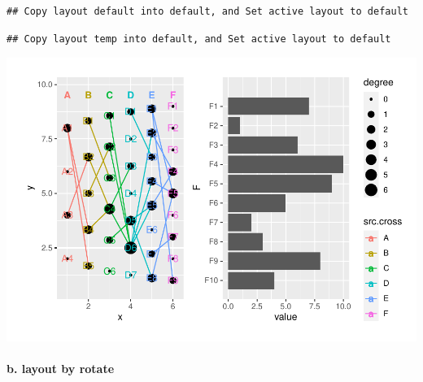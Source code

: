 \documentclass[
]{article}
\let\oldparagraph\paragraph
\renewcommand{\paragraph}[1]{\oldparagraph{#1}\mbox{}}
\begin{document}
\begin{verbatim}
## Copy layout default into default, and Set active layout to default
\end{verbatim}

\begin{verbatim}
## Copy layout temp into default, and Set active layout to default
\end{verbatim}

\includegraphics{ReadMe_files/figure-latex/unnamed-chunk-10-1.pdf}

\hypertarget{b.-layout-by-rotate}{%
\paragraph{b. layout by rotate}\label{b.-layout-by-rotate}}
\end{document}
